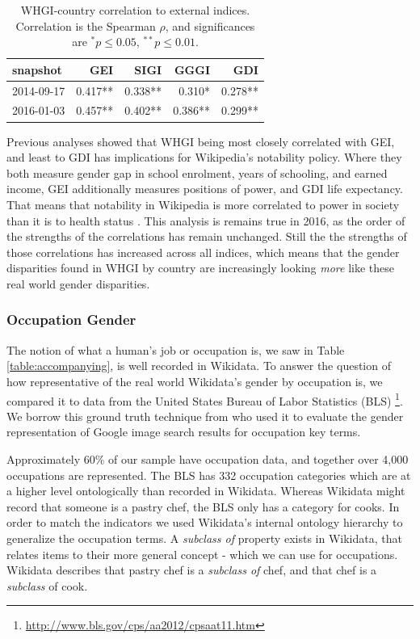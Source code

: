 \documentclass{sig-alternate-05-2015}
\begin{document}
\begin{table}
\caption{WHGI-country correlation to external indices. Correlation is the Spearman $\rho$, and significances are $ ^*p\leq 0.05 $, $ ^{**}p\leq 0.01$.}
\label{table:scores}
\begin{tabular}{lrrrr}
\toprule
snapshot &  GEI &  SIGI &  GGGI &  GDI  \\
\midrule
2014-09-17 &  0.417** &       0.338** &          0.310* &         0.278**  \\
2016-01-03 &  0.457** &       0.402** &          0.386** &         0.299**  \\
\bottomrule
\end{tabular}
\end{table}

Previous analyses showed that WHGI being most closely correlated with  GEI, and least to GDI has implications for Wikipedia's notability policy. Where they both measure gender gap in school enrolment, years of schooling, and earned income, GEI additionally measures positions of power, and GDI life expectancy. That means that notability in Wikipedia is more correlated to power in society than it is to health status \cite{klein_wikipedia_2015}. This analysis is remains true in 2016, as the order of the strengths of the correlations has remain unchanged. Still the the strengths of those correlations has increased across all indices, which means that the gender disparities found in WHGI by country are increasingly looking \textit{more} like these real world gender disparities.


\subsubsection{Occupation Gender}
The notion of what a human's job or occupation is, we saw in Table \ref{table:accompanying}, is well recorded in Wikidata. To answer the question of how representative of the real world Wikidata's gender by occupation is, we compared it to data from the United States Bureau of Labor Statistics (BLS) \footnote{\url{http://www.bls.gov/cps/aa2012/cpsaat11.htm}}. We borrow this ground truth technique from \cite{kay_unequal_2015} who used it to evaluate the gender representation of Google image search results for occupation key terms.

Approximately 60\% of our sample have occupation data, and together over 4,000 occupations are represented. The BLS has 332 occupation categories which are at a higher level ontologically than  recorded in Wikidata. Whereas Wikidata might record that someone is a pastry chef, the BLS only has a category for cooks. In order to match the indicators we used Wikidata's internal ontology hierarchy to generalize the occupation terms. A \textit{subclass of} property exists in Wikidata, that relates items to their more general concept - which we can use for occupations. Wikidata describes that pastry chef is a \textit{subclass of} chef, and that chef is a \textit{subclass} of cook. 
\end{document}
